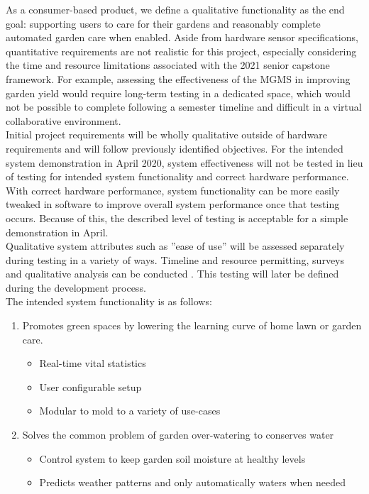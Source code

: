 \documentclass{report}
\begin{document}
\newpage
As a consumer-based product, we define a qualitative functionality as the end goal: supporting users to care for their gardens and reasonably complete automated garden care when enabled. Aside from hardware sensor specifications, quantitative requirements are not realistic for this project, especially considering the time and resource limitations associated with the 2021 senior capstone framework. For example, assessing the effectiveness of the MGMS in improving garden yield would require long-term testing in a dedicated space, which would not be possible to complete following a semester timeline and difficult in a virtual collaborative environment.\\

Initial project requirements will be wholly qualitative outside of hardware requirements and will follow previously identified objectives. For the intended system demonstration in April 2020, system effectiveness will not be tested in lieu of testing for intended system functionality and correct hardware performance. With correct hardware performance, system functionality can be more easily tweaked in software to improve overall system performance once that testing occurs. Because of this, the described level of testing is acceptable for a simple demonstration in April.\\

Qualitative system attributes such as ''ease of use'' will be assessed separately during testing in a variety of ways. Timeline and resource permitting, surveys and qualitative analysis can be conducted . This testing will later be defined during the development process.\\

The intended system functionality is as follows:

\begin{enumerate}[label=\alph*.]
    \item
          Promotes green spaces by lowering the learning curve of home lawn or garden care.
          \begin{itemize}
              \item
                    Real-time vital statistics
              \item
                    User configurable setup
              \item
                    Modular to mold to a variety of use-cases
          \end{itemize}
    \item
          Solves the common problem of garden over-watering to conserves water
          \begin{itemize}
              \item
                    Control system to keep garden soil moisture at healthy levels
              \item
                    Predicts weather patterns and only automatically waters when needed
          \end{itemize}
\end{enumerate}
\newpage
\end{document}
